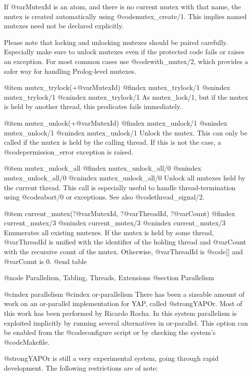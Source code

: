 If @var{MutexId} is an atom, and there is no current mutex with that
name, the mutex is created automatically using @code{mutex_create/1}.  This
implies named mutexes need not be declared explicitly.

Please note that locking and unlocking mutexes should be paired
carefully. Especially make sure to unlock mutexes even if the protected
code fails or raises an exception. For most common cases use
@code{with_mutex/2}, which provides a safer way for handling Prolog-level
mutexes.

@item mutex_trylock(+@var{MutexId})
@findex mutex_trylock/1
@snindex mutex_trylock/1
@cnindex mutex_trylock/1
As mutex_lock/1, but if the mutex is held by another thread, this
predicates fails immediately.

@item mutex_unlock(+@var{MutexId})
@findex mutex_unlock/1
@snindex mutex_unlock/1
@cnindex mutex_unlock/1
Unlock the mutex. This can only be called if the mutex is held by the
calling thread. If this is not the case, a @code{permission_error}
exception is raised.

@item mutex_unlock_all
@findex mutex_unlock_all/0
@snindex mutex_unlock_all/0
@cnindex mutex_unlock_all/0
Unlock all mutexes held by the current thread.  This call is especially
useful to handle thread-termination using @code{abort/0} or exceptions.  See
also @code{thread_signal/2}.

@item current_mutex(?@var{MutexId}, ?@var{ThreadId}, ?@var{Count})
@findex current_mutex/3
@snindex current_mutex/3
@cnindex current_mutex/3
Enumerates all existing mutexes.  If the mutex is held by some thread,
@var{ThreadId} is unified with the identifier of the holding thread and
@var{Count} with the recursive count of the mutex. Otherwise,
@var{ThreadId} is @code{[]} and @var{Count} is 0.
@end table


@node Parallelism, Tabling, Threads, Extensions
@section Parallelism

@cindex parallelism
@cindex or-parallelism
There has been a sizeable amount of work on an or-parallel
implementation for YAP, called @strong{YAPOr}. Most of this work has
been performed by Ricardo Rocha. In this system parallelism is exploited
implicitly by running several alternatives in or-parallel. This option
can be enabled from the @code{configure} script or by checking the
system's @code{Makefile}.

@strong{YAPOr} is still a very experimental system, going through rapid
development. The following restrictions are of note:

